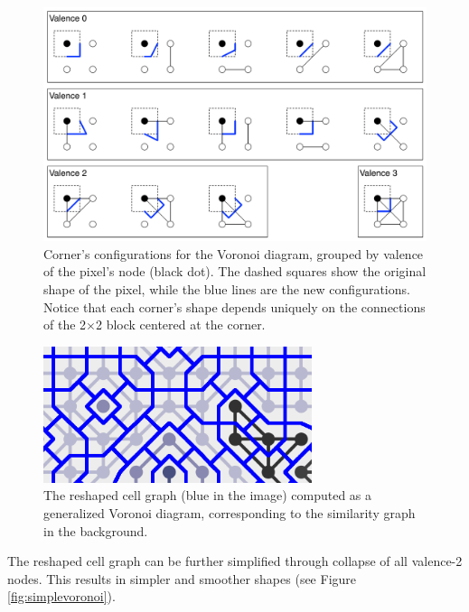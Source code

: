 \documentclass[]{usiinfbachelorproject}
\begin{document}
\begin{figure}[ht]
	\centering
	\includegraphics[width=1\textwidth]{img/voronoi_edges.pdf}
	\caption{Corner's configurations for the Voronoi diagram, grouped by valence of the pixel's node (black dot). The dashed squares show the original shape of the pixel, while the blue lines are the new configurations. Notice that each corner's shape depends uniquely on the connections of the 2$\times$2 block centered at the corner.}
	\label{fig:corners}
\end{figure}

\begin{figure}[ht]
	\centering
	\includegraphics[width=0.7\textwidth]{img/voronoi1.png}
	\caption{The reshaped cell graph (blue in the image) computed as a generalized Voronoi diagram, corresponding to the similarity graph in the background.}
	\label{fig:originalvoronoi}
\end{figure}

\noindent The reshaped cell graph can be further simplified through collapse of all valence-2 nodes. This results in simpler and smoother shapes (see Figure \ref{fig:simplevoronoi}). 
\end{document}
